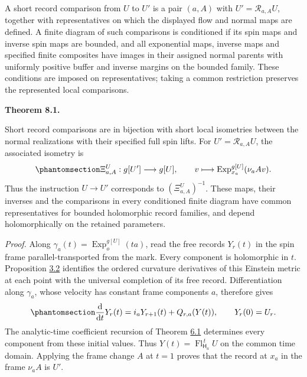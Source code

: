 \documentclass[
  english,
  11pt,
  reqno]{amsart}
\makeatletter
\newcommand{\pandocstatementheading}[1]{%
  \par\addpenalty{\@beginparpenalty}%
  \addvspace{.5\baselineskip plus .2\baselineskip minus .2\baselineskip}%
  {\normalfont\bfseries #1\par}%
  \nobreak\@afterindenttrue\@afterheading
}
\makeatother
\begin{document}
A short record comparison from \(U\) to \(U'\) is a pair \((a,A)\) with
\(U'=\mathcal R_{a,A}U\), together with representatives on which the
displayed flow and normal maps are defined. A finite diagram of such
comparisons is conditioned if its spin maps and inverse spin maps are
bounded, and all exponential maps, inverse maps and specified finite
composites have images in their assigned normal parents with uniformly
positive buffer and inverse margins on the bounded family. These
conditions are imposed on representatives; taking a common restriction
preserves the represented local comparisons.

\pandocstatementheading{\protect{}\label{thm:es-physical-arrows}Theorem 8.1.}

Short record comparisons are in bijection with short local isometries
between the normal realizations with their specified full spin lifts.
For \(U'=\mathcal R_{a,A}U\), the associated isometry is
\begin{equation}\protect\phantomsection\label{eq:es-normal-isometry}{
 \Xi^U_{a,A}:g[U']\longrightarrow g[U],\qquad
 v\longmapsto
 \operatorname{Exp}^{g[U]}_{x_a}(\nu_aAv).
}\end{equation} Thus the instruction \(U\to U'\) corresponds to
\((\Xi^U_{a,A})^{-1}\). These maps, their inverses and the comparisons
in every conditioned finite diagram have common representatives for
bounded holomorphic record families, and depend holomorphically on the
retained parameters.

\emph{Proof.} Along \(\gamma_a(t)=\operatorname{Exp}^{g[U]}_o(ta)\),
read the free records \(Y_r(t)\) in the spin frame parallel-transported
from the mark. Every component is holomorphic in \(t\). Proposition
\hyperref[prop:es-completion]{3.2} identifies the ordered curvature
derivatives of this Einstein metric at each point with the universal
completion of its free record. Differentiation along \(\gamma_a\), whose
velocity has constant frame components \(a\), therefore gives
\begin{equation}\protect\phantomsection\label{eq:es-geometric-record-flow}{
 \frac{\mathrm d}{\mathrm dt}Y_r(t)
       =i_aY_{r+1}(t)+Q_{r,a}(Y(t)),\qquad Y_r(0)=U_r.
}\end{equation} The analytic-time coefficient recursion of Theorem
\hyperref[thm:es-flow]{6.1} determines every component from these
initial values. Thus \(Y(t)=\operatorname{Fl}_{\mathsf H_a}^{\,t}U\) on
the common time domain. Applying the frame change \(A\) at \(t=1\)
proves that the record at \(x_a\) in the frame \(\nu_aA\) is \(U'\).
\end{document}
